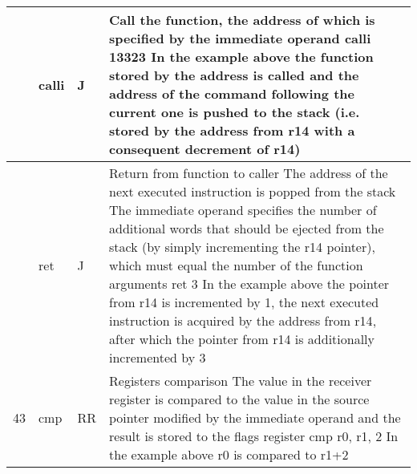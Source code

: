\documentclass{article}
\newcommand{\St}[1]{{\fontfamily{qcr}\selectfont #1}}
\newcommand{\Ss}[1]{{\fontfamily{cmss}\selectfont #1}}
\begin{document}
{\begin{table*}[h!]
\begin{tabular}{| >{\centering\arraybackslash} m{1cm} | >{\centering\arraybackslash} m{1.4cm} | >{\centering\arraybackslash} m{1.2cm} | m{11.6cm} |}
 \hline
 
 41 & \St{calli} & \Ss{J} &
 
 Call the function, the address of which is specified by the immediate operand \newline
 \St{calli 13323} \newline
 In the example above the function stored by the address \St{13323} is called \newline
 and the address of the command following the current one is pushed to \newline
 the stack (i.e. stored by the address from \St{r14} with a consequent \newline
 decrement of \St{r14})\\
 
 \hline
 
 42 & \St{ret} & \Ss{J} &
 
 Return from function to caller \newline
 The address of the next executed instruction is popped from the stack \newline
 The immediate operand specifies the number of additional words that should \newline
 be ejected from the stack (by simply incrementing the \St{r14} pointer), which \newline
 must equal the number of the function arguments \newline
 \St{ret 3} \newline
 In the example above the pointer from \St{r14} is incremented by 1, the next \newline
 executed instruction is acquired by the address from \St{r14}, after which \newline
 the pointer from \St{r14} is additionally incremented by 3 \\
 
 \hline
 
 43 & \St{cmp} & \Ss{RR} &
 
 Registers comparison \newline
 The value in the receiver register is compared to the value in the source \newline
 pointer modified by the immediate operand and the result is stored \newline
 to the \St{flags} register \newline
 \St{cmp r0, r1, 2} \newline
 In the example above \St{r0} is compared to \St{r1+2} \\
 

\end{tabular}
\end{table*}}
\end{document}
